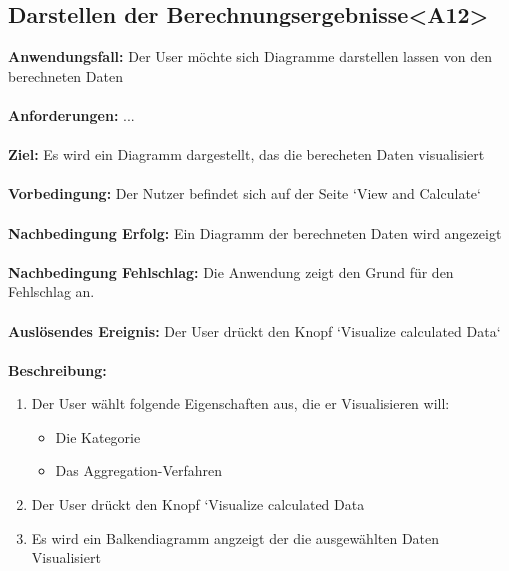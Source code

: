 \documentclass[parskip=full]{scrartcl} %
\begin{document}
\subsection*{Darstellen der Berechnungsergebnisse<A12>}
\textbf{Anwendungsfall:} Der User möchte sich Diagramme darstellen lassen von den berechneten Daten\\\\
\textbf{Anforderungen:} ...\\\\
\textbf{Ziel:} Es wird ein Diagramm dargestellt, das die berecheten Daten visualisiert\\\\
\textbf{Vorbedingung:}  Der Nutzer befindet sich auf der Seite `View and Calculate`\\\\
\textbf{Nachbedingung Erfolg:} Ein Diagramm der berechneten Daten wird angezeigt \\\\
\textbf{Nachbedingung Fehlschlag:} Die Anwendung zeigt den Grund für den Fehlschlag an.\\\\
\textbf{Auslösendes Ereignis:} Der User drückt den Knopf `Visualize calculated Data` \\\\
\textbf{Beschreibung:}
\begin{enumerate}
    \item Der User wählt folgende Eigenschaften aus, die er Visualisieren will:
    \begin{itemize}
        \item Die Kategorie
        \item Das Aggregation-Verfahren
    \end{itemize}
    \item Der User drückt den Knopf `Visualize calculated Data
    \item Es wird ein Balkendiagramm angzeigt der die ausgewählten Daten Visualisiert
\end{enumerate}
\newpage
\end{document}
